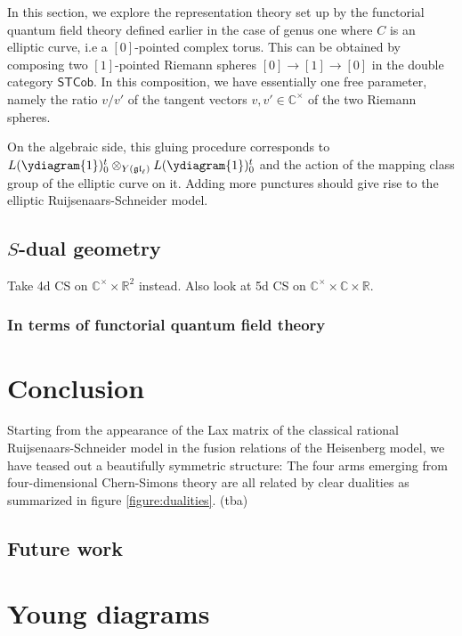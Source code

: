 \documentclass[11pt]{report}
\theoremstyle{definition}
\theoremstyle{remark}
\theoremstyle{remark}
\newcommand{\R}{\mathbb{R}}
\newcommand{\C}{\mathbb{C}}
\begin{document}
In this section, we explore the representation theory set up by the functorial quantum field theory defined earlier in the case of genus one where $C$ is an elliptic curve, i.e a $[0]$-pointed complex torus. This can be obtained by composing two $[1]$-pointed Riemann spheres $[0] \to [1] \to [0]$ in the double category $\mathsf{STCob}$. In this composition, we have essentially one free parameter, namely the ratio $v/v'$ of the tangent vectors $v,v' \in \C^\times$ of the two Riemann spheres.

On the algebraic side, this gluing procedure corresponds to $L(\ydiagram{1})_0^t \otimes_{Y(\mathfrak{gl}_\ell)} L(\ydiagram{1})_0^t$ and the action of the mapping class group of the elliptic curve on it. Adding more punctures should give rise to the elliptic Ruijsenaars-Schneider model.

\section{$S$-dual geometry}

Take 4d CS on $\C^\times \times \R^2$ instead. Also look at 5d CS on $\C^\times \times \C \times \R$.

\subsection{In terms of functorial quantum field theory}

\chapter{Conclusion}\label{chapter:conclusion}

Starting from the appearance of the Lax matrix of the classical rational Ruijsenaars-Schneider model in the fusion relations of the Heisenberg model, we have teased out a beautifully symmetric structure: The four arms emerging from four-dimensional Chern-Simons theory are all related by clear dualities as summarized in figure \ref{figure:dualities}. (tba)

\section*{Future work}



\appendix \label{appendix}

\chapter{Young diagrams} \label{appendix:youngdiagrams}
\end{document}

